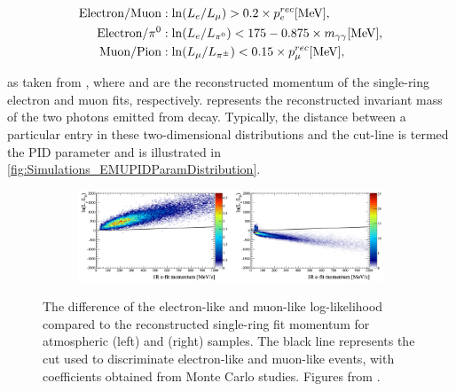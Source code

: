 \begin{align}
  \begin{split}
    \text{Electron/Muon} &: \ln(L_{e}/L_{\mu}) > 0.2 \times p_{e}^{rec} [\text{MeV}], \\
    \text{Electron/$\pi^{0}$} &: \ln(L_{e}/L_{\pi^{0}}) < 175 - 0.875 \times m_{\gamma\gamma} [\text{MeV}], \\
    \text{Muon/Pion} &: \ln(L_{\mu}/L_{\pi^{\pm}}) < 0.15 \times p_{\mu}^{rec} [\text{MeV}], \\
  \end{split}
\end{align}

as taken from \cite{t2k_tn_319}, where  and  are the reconstructed momentum of the single-ring electron and muon fits, respectively.  represents the reconstructed invariant mass of the two photons emitted from  decay. Typically, the distance between a particular entry in these two-dimensional distributions and the cut-line is termed the PID parameter and is illustrated in \autoref{fig:Simulations_EMUPIDParamDistribution}.

\begin{figure}[h]
  \begin{subfigure}[t]{1.0\textwidth}
    \includegraphics[width=\textwidth, trim={0mm 0mm 0mm 0mm}, clip, page=1]{Figures/Simulations/LogLikelihoodDiscriminator.pdf}
  \end{subfigure}
  \caption{The difference of the electron-like and muon-like log-likelihood compared to the reconstructed single-ring fit momentum for atmospheric  (left) and \quickmath{\nu_{\mu}} (right) samples. The black line represents the cut used to discriminate electron-like and muon-like events, with coefficients obtained from Monte Carlo studies. Figures from \cite{t2k_tn_146}.}
  \label{fig:Simulations_LLHDiscriminator}
\end{figure}

